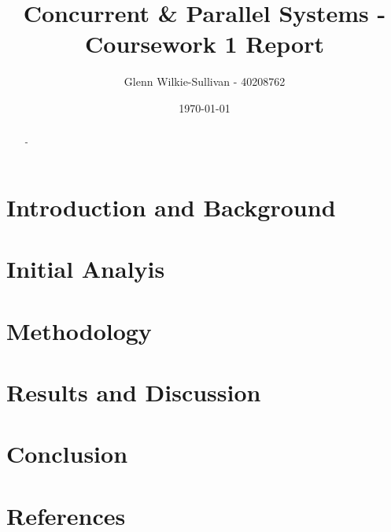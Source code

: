 \documentclass[12pt, a4paper]{article}
\title{\vspace{-4cm}Concurrent \& Parallel Systems - Coursework 1 Report}
\author{Glenn Wilkie-Sullivan - 40208762}
\date{\today}
\begin{document}
\maketitle

\begin{abstract}
-
\end{abstract}

\section{Introduction and Background}

\section{Initial Analyis}

\section{Methodology}

\section{Results and Discussion}

\section{Conclusion}

\section{References}
\end{document}
